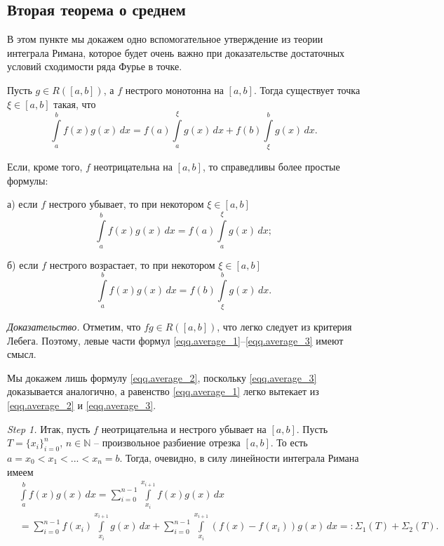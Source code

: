 \subsection{Вторая теорема о среднем}

В этом пункте мы докажем одно вспомогательное утверждение из теории интеграла Римана, которое 
будет очень важно при доказательстве достаточных условий сходимости ряда Фурье в точке.

\begin{theorem}
\label{Th.average}
Пусть $g \in R([a,b])$, а $f$ нестрого монотонна на $[a,b]$. Тогда существует точка $\xi \in [a,b]$ такая, что
\begin{equation}
\label{eqq.average_1}
\int\limits_{a}^{b}f(x)g(x)\,dx = f(a)\int\limits_{a}^{\xi}g(x)\,dx + f(b)\int\limits_{\xi}^{b}g(x)\,dx.
 \end{equation}

Если, кроме того, $f$ неотрицательна на $[a,b]$, то справедливы более простые формулы:

а) если $f$ нестрого убывает, то при некотором $\xi \in [a,b]$
\begin{equation}
\label{eqq.average_2}
\int\limits_{a}^{b}f(x)g(x)\,dx = f(a)\int\limits_{a}^{\xi}g(x)\,dx;
\end{equation}
 
б) если $f$ нестрого возрастает, то при некотором $\xi \in [a,b]$
\begin{equation}
\label{eqq.average_3}
\int\limits_{a}^{b}f(x)g(x)\,dx = f(b)\int\limits_{\xi}^{b}g(x)\,dx.
\end{equation}

\end{theorem}

\textit{Доказательство.} Отметим, что $fg \in R([a,b])$, что легко следует из критерия Лебега. Поэтому, левые части формул \eqref{eqq.average_1}--\eqref{eqq.average_3} имеют смысл.

Мы докажем лишь формулу \eqref{eqq.average_2}, поскольку \eqref{eqq.average_3} доказывается аналогично, а равенство \eqref{eqq.average_1} легко 
вытекает из \eqref{eqq.average_2} и \eqref{eqq.average_3}.

\textit{Step 1.}
Итак, пусть $f$ неотрицательна и нестрого убывает на $[a,b]$. Пусть $T=\{x_{i}\}_{i=0}^{n}$, $n \in \mathbb{N}$ -- произвольное разбиение отрезка $[a,b]$. То есть
$a=x_{0} < x_{1} < ... < x_{n} =b$. Тогда, очевидно, в силу линейности интеграла Римана имеем
\begin{equation}
\begin{split}
\label{eqq.13}
&\int\limits_{a}^{b}f(x)g(x)\,dx = \sum\limits_{i=0}^{n-1}\int\limits_{x_{i}}^{x_{i+1}}f(x)g(x)\,dx\\
&= \sum\limits_{i=0}^{n-1}f(x_{i})\int\limits_{x_{i}}^{x_{i+1}}g(x)\,dx
+\sum\limits_{i=0}^{n-1}\int\limits_{x_{i}}^{x_{i+1}}(f(x)-f(x_{i}))g(x)\,dx =:\Sigma_{1}(T)+\Sigma_{2}(T).
\end{split}
\end{equation}


